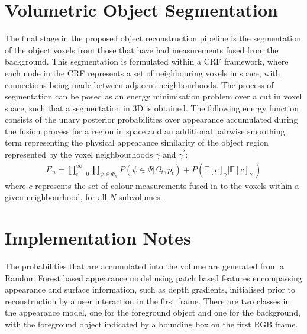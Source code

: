 \section{Volumetric Object Segmentation}
The final stage in the proposed object reconstruction pipeline is the segmentation of the object voxels from those that have had measurements fused 
from the background. This segmentation is formulated within a CRF framework, where each node in the CRF represents a set of neighbouring voxels in space, 
with connections being made between adjacent neighbourhoods. The process of segmentation can be posed as an energy minimisation problem over a cut in voxel space, 
such that a segmentation in 3D is obtained. The following energy function consists of the unary posterior probabilities over appearance accumulated during the fusion 
process for a region in space and an additional pairwise smoothing term representing the physical appearance similarity of the object region represented by the voxel 
neighbourhoods $\gamma$ and $\gamma^{'}$:
\begin{equation}
\begin{split}
E_{n} = \prod_{t=0}^{\infty} \prod_{\psi \in \Phi_{n}} P(\psi \in \Psi | \Omega_{t}, p_{t}) + P(\mathbb{E}[c]_{\gamma} | \mathbb{E}[c]_{\gamma^{'}})
\end{split}
\end{equation}
where $c$ represents the set of colour measurements fused in to the voxels within a given neighbourhood, for all $N$ subvolumes.

\section{Implementation Notes}
The probabilities that are accumulated into the volume are generated from a Random Forest based appearance model using patch based features encompassing 
appearance and surface information, such as depth gradients, initialised prior to reconstruction by a user interaction in the first frame. There are two 
classes in the appearance model, one for the foreground object and one for the background, with the foreground object indicated by a bounding box on the 
first RGB frame.

